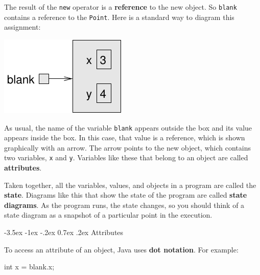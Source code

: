 \documentclass[12pt]{book}
\makeatletter
\theoremstyle{exercise}
\newcommand{\java}[1]{\verb"#1"}
\renewcommand{\section}{\@startsection{section}{1}{\z@}%
    {-3.5ex \@plus -1ex \@minus -.2ex}%
    {0.7ex \@plus.2ex}%
    {\normalfont\Large\bfseries}}
\newcommand{\java}[1]{\lstinline{#1}} %
\makeatother
\begin{document}

The result of the \java{new} operator is a {\bf reference} to the new object.
So \java{blank} contains a reference to the \java{Point}.
Here is a standard way to diagram this assignment:

\begin{center}
\includegraphics{figs/reference.pdf}
\end{center}


As usual, the name of the variable \java{blank} appears outside the box and its value appears inside the box.
In this case, that value is a reference, which is shown graphically with an arrow.
The arrow points to the new object, which contains two variables, \java{x} and \java{y}.
Variables like these that belong to an object are called {\bf attributes}.



Taken together, all the variables, values, and objects in a program are called the {\bf state}.
Diagrams like this that show the state of the program are called {\bf state diagrams}.
As the program runs, the state changes, so you should think of a state diagram as a snapshot of a particular point in the execution.




\section{Attributes}

To access an attribute of an object, Java uses {\bf dot notation}.
For example:

\begin{code}
    int x = blank.x;
\end{code}
\end{document}
